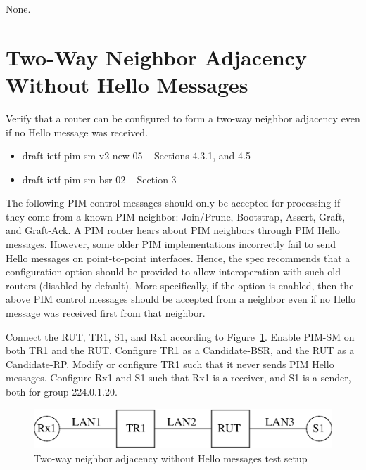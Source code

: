 \documentclass[11pt]{report}
\begin{document}
None.

\newpage
\section{Two-Way Neighbor Adjacency Without Hello Messages}

Verify that a router can be configured to form a two-way neighbor adjacency
even if no Hello message was received.

\begin{itemize}
  \item draft-ietf-pim-sm-v2-new-05 -- Sections 4.3.1, and 4.5
  \item draft-ietf-pim-sm-bsr-02 -- Section 3
\end{itemize}

The following PIM control messages should only be accepted for processing if
they come from a known PIM neighbor: Join/Prune, Bootstrap, Assert, Graft, and
Graft-Ack. A PIM router hears about PIM neighbors
through PIM Hello messages. However, some older PIM implementations
incorrectly fail to send Hello messages on point-to-point interfaces. Hence,
the spec recommends that a configuration option should be provided to allow
interoperation with such old routers (disabled by default). More specifically,
if the option is enabled, then the above PIM control messages should be
accepted from a neighbor even if no Hello message was received first from that
neighbor.

Connect the RUT, TR1, S1, and Rx1 according to
Figure~\ref{fig:pim_test_2_7_two_way_neighbor_adjacency_without_hello_messages}.
Enable PIM-SM on both TR1 and the RUT. Configure TR1
as a Candidate-BSR, and the RUT as a Candidate-RP. Modify or configure TR1
such that it never sends PIM Hello messages. Configure Rx1 and S1 such
that Rx1 is a receiver, and S1 is a sender, both for group 224.0.1.20.

\begin{figure}[htbp]
  \begin{center}
    \includegraphics[scale=0.8]{figs/pim_test_2_7_two_way_neighbor_adjacency_without_hello_messages}
    \caption{Two-way neighbor adjacency without Hello messages test
    setup}
    \label{fig:pim_test_2_7_two_way_neighbor_adjacency_without_hello_messages}
  \end{center}
\end{figure}
\end{document}
